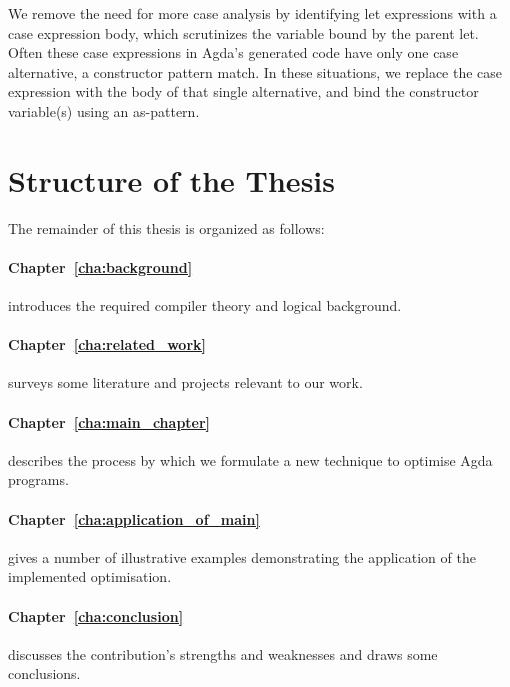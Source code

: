 We remove the need for more case analysis by identifying let expressions with a case expression body, which scrutinizes the variable bound by the parent let. Often these case expressions in Agda's generated code have only one case alternative, a constructor pattern match. In these situations, we replace the case expression with the body of that single alternative, and bind the constructor variable(s) using an as-pattern.


\section{Structure of the Thesis}
\label{sec:structure_of_the_thesis}

The remainder of this thesis is organized as follows:

\paragraph{Chapter~\ref{cha:background}} introduces the required compiler theory and logical background.

\paragraph{Chapter~\ref{cha:related_work}} surveys some literature and projects relevant to our work.

\paragraph{Chapter~\ref{cha:main_chapter}} describes the process by which we formulate a new technique to optimise Agda programs.

\paragraph{Chapter~\ref{cha:application_of_main}} gives a number of illustrative examples demonstrating the application of the implemented optimisation.

\paragraph{Chapter~\ref{cha:conclusion}} discusses the contribution's strengths and weaknesses and draws some conclusions.
